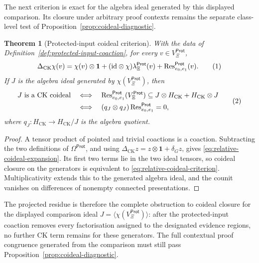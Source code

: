 \documentclass[10pt,a4paper]{article}
\theoremstyle{plain}
\newtheorem{theorem}{Theorem}[section]
\theoremstyle{definition}
\theoremstyle{remark}
\newcommand{\HCK}{H_{\mathrm{CK}}}
\newcommand{\DeltaCK}{\Delta_{\mathrm{CK}}}
\newcommand{\one}{\mathbf 1}
\newcommand{\eqtag}{\refstepcounter{equation}\tag{\theequation}}
\begin{document}
The next criterion is exact for the algebra ideal generated by this
displayed comparison.  Its closure under arbitrary proof contexts remains
the separate class-level test of
Proposition~\ref{prop:coideal-diagnostic}.

\begin{theorem}[Protected-input coideal criterion]
\label{thm:protected-relative-descent}
With the data of Definition~\ref{def:protected-input-coaction}, for every
\(v\in V_\Xi^{\mathsf{Prot}}\),
\[
 \DeltaCK \chi(v)
  =\chi(v)\otimes\one
   +(\mathrm{id}\otimes \chi)\lambda_\Xi^{\mathsf{Prot}}(v)
   +\operatorname{Res}_{e_0,e_1}^{\mathsf{Prot}}(v).
\eqtag\label{eq:relative-coideal-expansion}
\]
If \(J\) is the algebra ideal generated by
\(\chi(V_\Xi^{\mathsf{Prot}})\), then
\[
\begin{split}
 J\text{ is a CK coideal}
 &\quad\Longleftrightarrow\quad
 \operatorname{Res}_{e_0,e_1}^{\mathsf{Prot}}(V_\Xi^{\mathsf{Prot}})
 \subseteq J\otimes\HCK+\HCK\otimes J\\
 &\quad\Longleftrightarrow\quad
 (q_J\otimes q_J)\operatorname{Res}_{e_0,e_1}^{\mathsf{Prot}}=0,
\end{split}
\eqtag\label{eq:relative-coideal-criterion}
\]
where \(q_J:\HCK\to\HCK/J\) is the algebra quotient.
\end{theorem}

\begin{proof}
A tensor product of pointed and trivial coactions is a coaction.
Subtracting the two definitions of \(\Omega^{\mathsf{Prot}}\), and using
\(\DeltaCK z=z\otimes\one+\delta_Gz\), gives
\eqref{eq:relative-coideal-expansion}.  Its first two terms lie in the two
ideal tensors, so coideal closure on the generators is equivalent to
\eqref{eq:relative-coideal-criterion}.  Multiplicativity extends this to
the generated algebra ideal, and the counit vanishes on differences of
nonempty connected presentations.
\end{proof}

The projected residue is therefore the complete obstruction to coideal
closure for the displayed comparison ideal
\(J=\langle \chi(V_\Xi^{\mathsf{Prot}})\rangle\): after the protected-input coaction
removes every factorisation assigned to the designated evidence regions,
no further CK term remains for these generators.  The full contextual
proof congruence generated from the comparison must still pass
Proposition~\ref{prop:coideal-diagnostic}.
\end{document}
